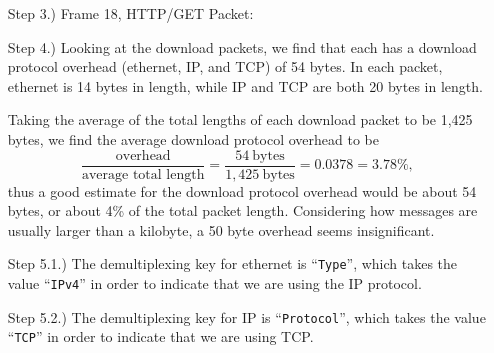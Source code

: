 \documentclass[12pt]{article}
\begin{document}
    \pagestyle{fancy}


    \begin{itemize}
        \item [Step 3.)] Frame 18, HTTP/GET Packet:
        \begin{center}
        \end{center}

        \item [Step 4.)] Looking at the download packets, we find that each has
        a download protocol overhead (ethernet, IP, and TCP) of 54 bytes.
        In each packet, ethernet is 14 bytes in length, while IP and TCP are
        both 20 bytes in length.
        
        Taking the average of the total lengths of each download packet to be
        1,425 bytes, we find the average download protocol overhead to be
        \[
            \frac{\text{overhead}}{\text{average total length}}
            = \frac{54 \ \text{bytes}}{1,425 \ \text{bytes}}
            = 0.0378
            = 3.78\%
            ,
        \]
        thus a good estimate for the download protocol overhead would be about
        54 bytes, or about 4\% of the total packet length. Considering how messages
        are usually larger than a kilobyte, a 50 byte overhead seems insignificant.

        \item [Step 5.1.)] The demultiplexing key for ethernet is
        ``\verb|Type|'', which takes the value ``\verb|IPv4|'' in order to
        indicate that we are using the IP protocol.

        \item [Step 5.2.)] The demultiplexing key for IP is ``\verb|Protocol|'',
        which takes the value ``\verb|TCP|'' in order to indicate that we are
        using TCP.
    \end{itemize}
\end{document}
